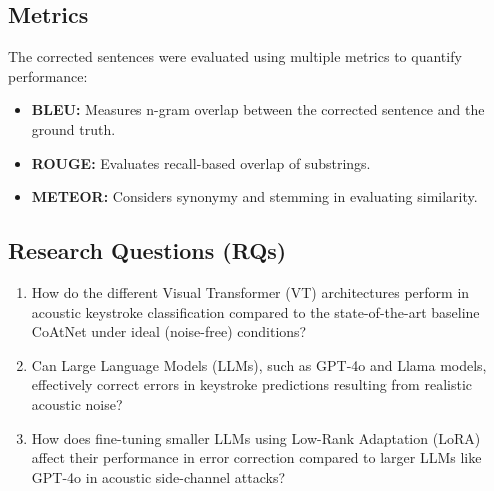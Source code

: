 \subsection{Metrics}
The corrected sentences were evaluated using multiple metrics to quantify performance:
\begin{itemize}
    \item \textbf{BLEU:} Measures n-gram overlap between the corrected sentence and the ground truth.
    \item \textbf{ROUGE:} Evaluates recall-based overlap of substrings.
    \item \textbf{METEOR:} Considers synonymy and stemming in evaluating similarity.
\end{itemize}

\subsection{Research Questions (RQs)}

\begin{enumerate}
    \item How do the different Visual Transformer (VT) architectures perform in acoustic keystroke classification compared to the state-of-the-art baseline CoAtNet under ideal (noise-free) conditions?
    \item Can Large Language Models (LLMs), such as GPT-4o and Llama models, effectively correct errors in keystroke predictions resulting from realistic acoustic noise?
    \item How does fine-tuning smaller LLMs using Low-Rank Adaptation (LoRA) affect their performance in error correction compared to larger LLMs like GPT-4o in acoustic side-channel attacks?
\end{enumerate}

